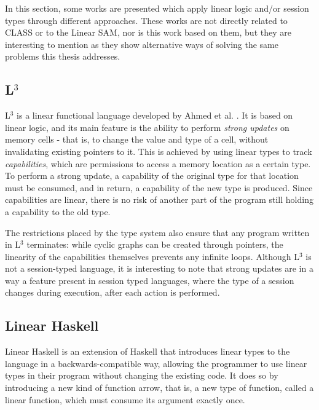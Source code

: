 In this section, some works \cite{Ahmed:2007, Bernardy:2017,Kokke:2021,Jespersen:2015, Lagaillardie:2022} are presented which apply linear logic and/or session types through different approaches. These works are not directly related to \ac{CLASS} or to the Linear \ac{SAM}, nor is this work based on them, but they are interesting to mention as they show alternative ways of solving the same problems this thesis addresses.

\subsection{\texorpdfstring{L$^3$}{L3}}

L$^3$ is a linear functional language developed by Ahmed et al. \cite{Ahmed:2007}. It is based on linear logic, and its main feature is the ability to perform \textit{strong updates} on memory cells - that is, to change the value and type of a cell, without invalidating existing pointers to it. This is achieved by using linear types to track \textit{capabilities}, which are permissions to access a memory location as a certain type. To perform a strong update, a capability of the original type for that location must be consumed, and in return, a capability of the new type is produced. Since capabilities are linear, there is no risk of another part of the program still holding a capability to the old type.

The restrictions placed by the type system also ensure that any program written in L$^3$ terminates: while cyclic graphs can be created through pointers, the linearity of the capabilities themselves prevents any infinite loops. Although L$^3$ is not a session-typed language, it is interesting to note that strong updates are in a way a feature present in session typed languages, where the type of a session changes during execution, after each action is performed.

\subsection{Linear Haskell}

Linear Haskell \cite{Bernardy:2017} is an extension of Haskell that introduces linear types to the language in a backwards-compatible way, allowing the programmer to use linear types in their program without changing the existing code. It does so by introducing a new kind of function arrow, that is, a new type of function, called a linear function, which must consume its argument exactly once.

